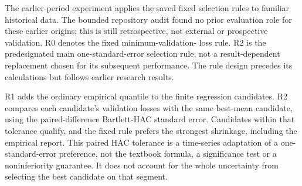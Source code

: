 \documentclass[11pt,a4paper]{article}
\begin{document}
The earlier-period experiment applies the saved fixed selection rules
to familiar historical data. The bounded repository audit found no prior
evaluation role for these earlier origins; this is still retrospective, not
external or prospective validation. R0 denotes the fixed minimum-validation-
loss rule. R2 is the predesignated main one-standard-error selection rule,
not a result-dependent replacement chosen for its subsequent performance.
The rule design precedes its calculations but follows earlier research results.

R1 adds the ordinary empirical quantile to the finite regression candidates.
R2 compares each candidate's validation losses with the same best-mean
candidate, using the paired-difference Bartlett-HAC standard error. Candidates
within that tolerance qualify, and the fixed rule prefers the strongest
shrinkage, including the empirical report. This paired HAC tolerance is a
time-series adaptation of a one-standard-error preference, not the textbook
formula, a significance test or a noninferiority guarantee. It does not account
for the whole uncertainty from selecting the best candidate on that segment.
\end{document}
